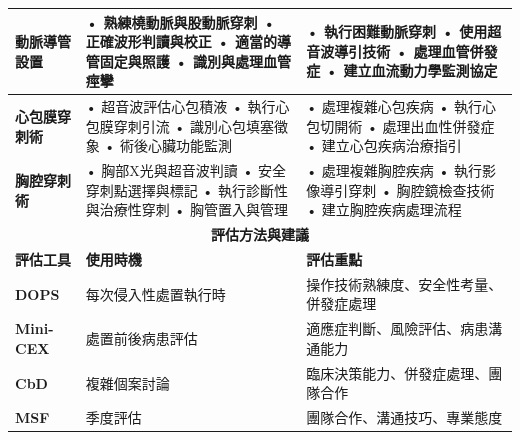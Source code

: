 \documentclass[12pt,a4paper]{article}
\begin{document}
\begin{longtable}{|p{1.5cm}|p{4cm}|p{8.5cm}|}
\textbf{動脈導管設置} & • 熟練橈動脈與股動脈穿刺 \newline • 正確波形判讀與校正 \newline • 適當的導管固定與照護 \newline • 識別與處理血管痙攣 & • 執行困難動脈穿刺 \newline • 使用超音波導引技術 \newline • 處理血管併發症 \newline • 建立血流動力學監測協定 \\
\hline

\textbf{心包膜穿刺術} & • 超音波評估心包積液 \newline • 執行心包膜穿刺引流 \newline • 識別心包填塞徵象 \newline • 術後心臟功能監測 & • 處理複雜心包疾病 \newline • 執行心包切開術 \newline • 處理出血性併發症 \newline • 建立心包疾病治療指引 \\
\hline

\textbf{胸腔穿刺術} & • 胸部X光與超音波判讀 \newline • 安全穿刺點選擇與標記 \newline • 執行診斷性與治療性穿刺 \newline • 胸管置入與管理 & • 處理複雜胸腔疾病 \newline • 執行影像導引穿刺 \newline • 胸腔鏡檢查技術 \newline • 建立胸腔疾病處理流程 \\
\hline

\multicolumn{3}{|c|}{\textbf{評估方法與建議}} \\
\hline
\rowcolor{emergency_gray!10}
\textbf{評估工具} & \textbf{使用時機} & \textbf{評估重點} \\
\hline

\textbf{DOPS} & 每次侵入性處置執行時 & 操作技術熟練度、安全性考量、併發症處理 \\
\hline

\textbf{Mini-CEX} & 處置前後病患評估 & 適應症判斷、風險評估、病患溝通能力 \\
\hline

\textbf{CbD} & 複雜個案討論 & 臨床決策能力、併發症處理、團隊合作 \\
\hline

\textbf{MSF} & 季度評估 & 團隊合作、溝通技巧、專業態度 \\
\hline


\end{longtable}
\end{document}
